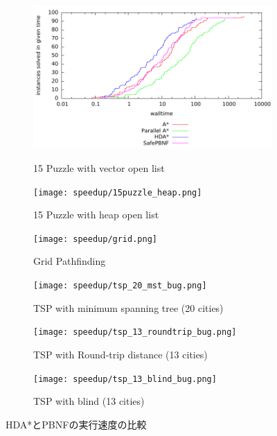 \documentclass{jsarticle}
\begin{document}
\begin{figure}
	\centering
	\begin{subfigure}{0.4\columnwidth}
		\includegraphics[width=\columnwidth]{eps/15puzzle_vector_walltime.pdf}
		\label{fig:15puzzle_vector}
		\caption{15 Puzzle with vector open list}
	\end{subfigure}

	\begin{subfigure}{0.4\columnwidth}
		\texttt{[image: speedup/15puzzle\_heap.png]}
		\label{fig:15puzzle_vector}
		\caption{15 Puzzle with heap open list}
	\end{subfigure}

	\begin{subfigure}{0.4\columnwidth}
		\texttt{[image: speedup/grid.png]}
		\label{fig:grid}
		\caption{Grid Pathfinding}
	\end{subfigure}

	\begin{subfigure}{0.4\columnwidth}
		\texttt{[image: speedup/tsp\_20\_mst\_bug.png]}
		\label{fig:tsp_20_mst}
		\caption{TSP with minimum spanning tree (20 cities)}
	\end{subfigure}

	\begin{subfigure}{0.4\columnwidth}
		\texttt{[image: speedup/tsp\_13\_roundtrip\_bug.png]}
		\label{fig:tsp_13_round}
		\caption{TSP with Round-trip distance (13 cities)}
	\end{subfigure}

	\begin{subfigure}{0.4\columnwidth}
		\texttt{[image: speedup/tsp\_13\_blind\_bug.png]}
		\label{fig:tsp_13_blind}
		\caption{TSP with blind (13 cities)}
	\end{subfigure}
	\label{fig:comparison}
	\caption{HDA*とPBNFの実行速度の比較}
\end{figure}%
\end{document}

